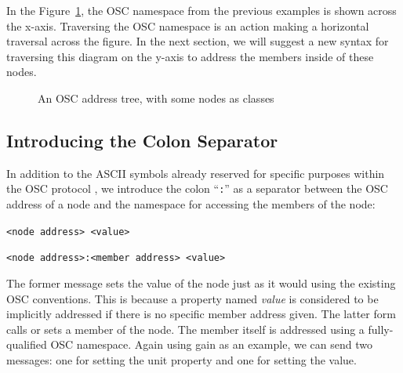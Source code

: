 \documentclass{NIME-alternate}
\begin{document}
\begin{Abstract}
In the Figure~\ref{fig:paths}, the OSC namespace from the previous examples is shown across the x-axis. Traversing the OSC namespace is an action making a horizontal traversal across the figure.  In the next section, we will suggest a new syntax for traversing this diagram on the y-axis to address the members inside of these nodes.

\begin{figure}
\centerline{}
\caption{An OSC address tree, with some nodes as classes}
\label{fig:paths}
\end{figure}



\subsection{Introducing the Colon Separator} %
\label{sub:the_colon_separator}

In addition to the ASCII symbols already reserved for specific purposes within the OSC protocol \cite{Wright:1997}, we introduce the colon ``\texttt{:}'' as a separator between the OSC address of a node and the namespace for accessing the members of the node:

\texttt{<node address> <value>}

\texttt{<node address>:<member address> <value>}

The former message sets the value of the node just as it would using the existing OSC conventions. This is because a property named \emph{value} is considered to be implicitly addressed if there is no specific member address given. The latter form calls or sets a member of the node.  The member itself is addressed using a fully-qualified OSC namespace. Again using gain as an example, we can send two messages: one for setting the unit property and one for setting the value.


\end{Abstract}
\end{document}
